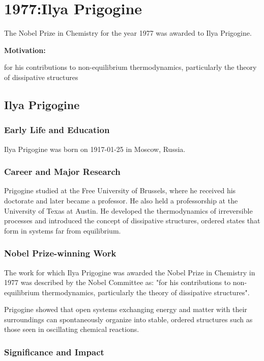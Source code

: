 \chapter{1977:Ilya Prigogine}

\label{chap:chemistry1977}

The Nobel Prize in Chemistry for the year 1977 was awarded to Ilya Prigogine.

\textbf{Motivation:}

for his contributions to non-equilibrium thermodynamics, particularly the theory of dissipative structures

\section{Ilya Prigogine}

\subsection*{Early Life and Education}

Ilya Prigogine was born on 1917-01-25 in Moscow, Russia.

\subsection*{Career and Major Research}

Prigogine studied at the Free University of Brussels, where he received his doctorate and later became a professor. He also held a professorship at the University of Texas at Austin. He developed the thermodynamics of irreversible processes and introduced the concept of dissipative structures, ordered states that form in systems far from equilibrium.

\subsection*{Nobel Prize-winning Work}

The work for which Ilya Prigogine was awarded the Nobel Prize in Chemistry in 1977 was described by the Nobel Committee as: "for his contributions to non-equilibrium thermodynamics, particularly the theory of dissipative structures".

Prigogine showed that open systems exchanging energy and matter with their surroundings can spontaneously organize into stable, ordered structures such as those seen in oscillating chemical reactions.

\subsection*{Significance and Impact}

